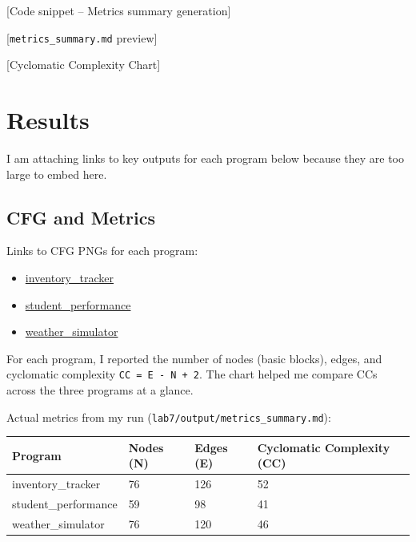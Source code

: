 \documentclass[10pt,a4paper]{report}
\begin{document}
[Code snippet -- Metrics summary generation]

[\texttt{metrics\_summary.md} preview]

[Cyclomatic Complexity Chart]

\section{Results}

I am attaching links to key outputs for each program below because they are too large to embed here.

\subsection{CFG and Metrics}

Links to CFG PNGs for each program:
\begin{itemize}[itemsep=0em, topsep=0pt]
    \item \href{https://github.com/ShardulJunagade/cs202-stt/tree/main/lab7/output/inventory_tracker/cfg.png}{inventory\_tracker}
    \item \href{https://github.com/ShardulJunagade/cs202-stt/tree/main/lab7/output/student_performance/cfg.png}{student\_performance}
    \item \href{https://github.com/ShardulJunagade/cs202-stt/tree/main/lab7/output/weather_simulator/cfg.png}{weather\_simulator}
\end{itemize}

For each program, I reported the number of nodes (basic blocks), edges, and cyclomatic complexity \texttt{CC = E - N + 2}. The chart helped me compare CCs across the three programs at a glance.

Actual metrics from my run (\texttt{lab7/output/metrics\_summary.md}):

\begin{table}[H]
\centering
\begin{tabular}{|l|l|l|l|}
\hline
Program & Nodes (N) & Edges (E) & Cyclomatic Complexity (CC) \\
\hline
inventory\_tracker & 76 & 126 & 52 \\
student\_performance & 59 & 98 & 41 \\
weather\_simulator & 76 & 120 & 46 \\
\hline
\end{tabular}
\end{table}
\end{document}
